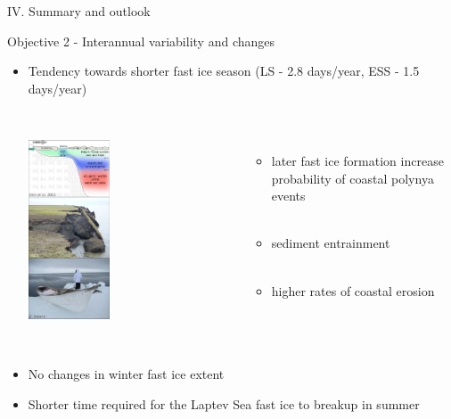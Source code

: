 \documentclass[8pt]{beamer}
\begin{document}
\setwatermark{\fontsize{125pt}{125pt}\selectfont{}}
\begin{frame}{IV. Summary and outlook}
	\begin{block}{Objective 2 - Interannual variability and changes}
		\begin{itemize}
			\item Tendency towards shorter fast ice season (LS - 2.8 days/year, ESS - 1.5 days/year)\\~\\
					\begin{columns}
						\begin{center}
							\includegraphics[width=0.4\textwidth]{./img/FI_imp_fin.pdf}\\~\\
						\end{center}
						\begin{itemize}
							\item later fast ice formation increase probability of coastal polynya events\\~\\
							\item sediment entrainment\\~\\
							\item higher rates of coastal erosion\\~\\

						\end{itemize}			
					\end{columns}
			\item No changes in winter fast ice extent
			\item Shorter time required for the Laptev Sea fast ice to breakup in summer 
		\end{itemize}
	\end{block}
\end{frame}
\end{document}
